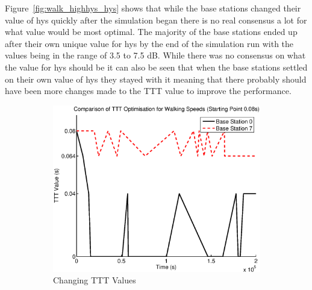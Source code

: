 Figure~\ref{fig:walk_highhys_hys} shows that while the base stations changed their value of hys quickly after the simulation began there is no real consensus a lot for what value would be most optimal. The majority of the base stations ended up after their own unique value for hys by the end of the simulation run with the values being in the range of 3.5 to 7.5 dB. While there was no consensus on what the value for hys should be it can also be seen that when the base stations settled on their own value of hys they stayed with it meaning that there probably should have been more changes made to the TTT value to improve the performance.
\begin{figure}[H]
        \centering
        \begin{subfigure}[b]{0.49\textwidth}
                \includegraphics[width=\textwidth]{figures/walking_figures/highhys/long_ttt.eps}
                \caption{Changing TTT Values}
                \label{fig:walk_highhys_ttt}
        \end{subfigure}%
        ~ %
        \begin{subfigure}[b]{0.49\textwidth}

\end{subfigure}
\end{figure}

